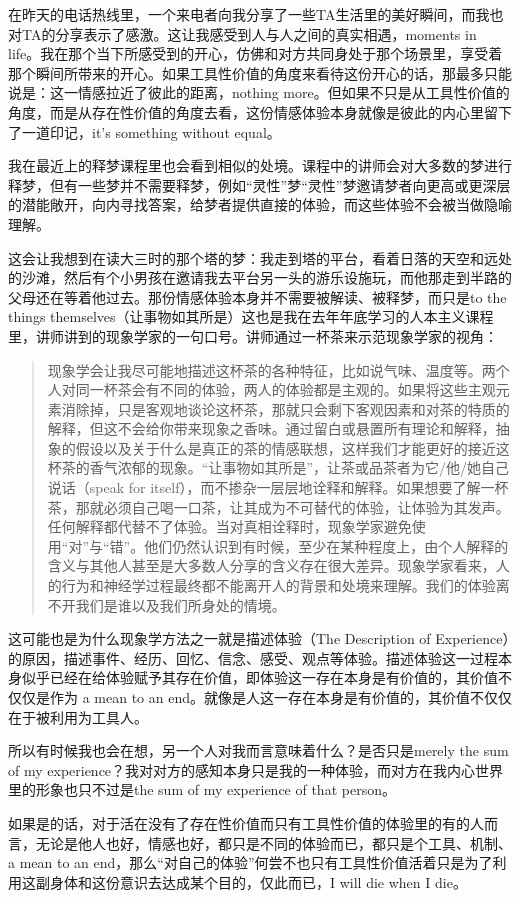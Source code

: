 在昨天的电话热线里，一个来电者向我分享了一些TA生活里的美好瞬间，而我也对TA的分享表示了感激。这让我感受到人与人之间的真实相遇，moments in life。我在那个当下所感受到的开心，仿佛和对方共同身处于那个场景里，享受着那个瞬间所带来的开心。如果工具性价值的角度来看待这份开心的话，那最多只能说是：这一情感拉近了彼此的距离，nothing more。但如果不只是从工具性价值的角度，而是从存在性价值的角度去看，这份情感体验本身就像是彼此的内心里留下了一道印记，it's something without equal。

我在最近上的释梦课程里也会看到相似的处境。课程中的讲师会对大多数的梦进行释梦，但有一些梦并不需要释梦，例如“灵性”梦\pozhehao{}“灵性”梦邀请梦者向更高或更深层的潜能敞开，向内寻找答案，给梦者提供直接的体验，而这些体验不会被当做隐喻理解。

这会让我想到在读大三时的那个塔的梦：我走到塔的平台，看着日落的天空和远处的沙滩，然后有个小男孩在邀请我去平台另一头的游乐设施玩，而他那走到半路的父母还在等着他过去。那份情感体验本身并不需要被解读、被释梦，而只是to the things themselves（让事物如其所是）\pozhehao{}这也是我在去年年底学习的人本主义课程里，讲师讲到的现象学家的一句口号。讲师通过一杯茶来示范现象学家的视角：

\blockquote{现象学会让我尽可能地描述这杯茶的各种特征，比如说气味、温度等。两个人对同一杯茶会有不同的体验，两人的体验都是主观的。如果将这些主观元素消除掉，只是客观地谈论这杯茶，那就只会剩下客观因素和对茶的特质的解释，但这不会给你带来现象之香味。通过留白或悬置所有理论和解释，抽象的假设以及关于什么是真正的茶的情感联想，这样我们才能更好的接近这杯茶的香气浓郁的现象。“让事物如其所是”，让茶或品茶者为它/他/她自己说话（speak for itself），而不掺杂一层层地诠释和解释。如果想要了解一杯茶，那就必须自己喝一口茶，让其成为不可替代的体验，让体验为其发声。任何解释都代替不了体验。当对真相诠释时，现象学家避免使用“对”与“错”。他们仍然认识到有时候，至少在某种程度上，由个人解释的含义与其他人甚至是大多数人分享的含义存在很大差异。现象学家看来，人的行为和神经学过程最终都不能离开人的背景和处境来理解。我们的体验离不开我们是谁以及我们所身处的情境。}

这可能也是为什么现象学方法之一就是描述体验（The Description of Experience）的原因，描述事件、经历、回忆、信念、感受、观点等体验。描述体验这一过程本身似乎已经在给体验赋予其存在价值，即体验这一存在本身是有价值的，其价值不仅仅是作为 a mean to an end。就像是人这一存在本身是有价值的，其价值不仅仅在于被利用为工具人。

所以有时候我也会在想，另一个人对我而言意味着什么？是否只是merely the sum of my experience？我对对方的感知本身只是我的一种体验，而对方在我内心世界里的形象也只不过是the sum of my experience of that person。

如果是的话，对于活在没有了存在性价值而只有工具性价值的体验里的有的人而言，无论是他人也好，情感也好，都只是不同的体验而已，都只是个工具、机制、a mean to an end，那么“对自己的体验”何尝不也只有工具性价值\pozhehao{}活着只是为了利用这副身体和这份意识去达成某个目的，仅此而已，I will die when I die。

